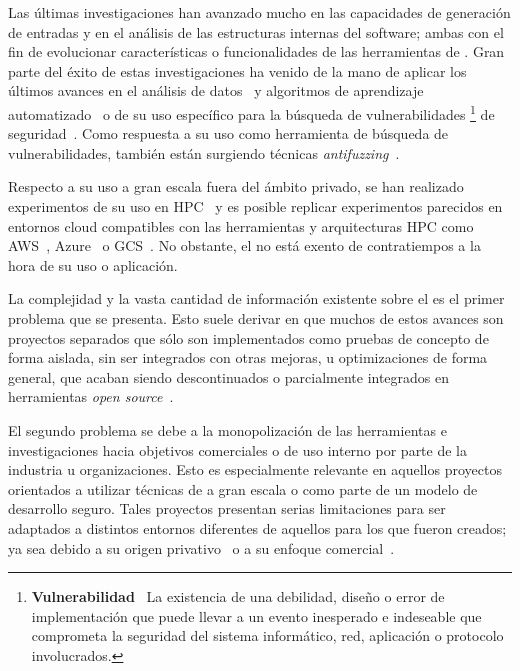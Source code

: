 \documentclass[10pt,conference,a4paper]{IEEEtran}
\begin{document}
Las últimas investigaciones han avanzado mucho en las capacidades de generación de entradas y en el análisis de las estructuras internas del software; ambas con el fin de evolucionar características o funcionalidades de las herramientas de {\fz}. Gran parte del éxito de estas investigaciones ha venido de la mano de aplicar los últimos avances en el análisis de datos~\cite{anal_datos} y algoritmos de aprendizaje automatizado~\cite{aprend_auto} o de su uso específico para la búsqueda de vulnerabilidades%
\footnote{\textbf{Vulnerabilidad}~\cite{ENISA_risk_security_ref}
La existencia de una debilidad, diseño o error de implementación que puede llevar a un evento inesperado e indeseable que comprometa la seguridad del sistema informático, red, aplicación o protocolo involucrados.
}
de seguridad~\cite{fuzzing_V-Fuzz}. Como respuesta a su uso como herramienta de búsqueda de vulnerabilidades, también están surgiendo técnicas \textit{antifuzzing}~\cite{fuzzing_antifuzz}.

Respecto a su uso a gran escala fuera del ámbito privado, se han realizado experimentos de su uso en HPC~\cite{HPC_fuzzing} y es posible replicar experimentos parecidos en entornos cloud compatibles con las herramientas y arquitecturas HPC como AWS~\cite{AWS_doc-slurm_plugin}, Azure~\cite{Azure_doc-CycleCloud_slurm} o GCS~\cite{slurm_doc-elastic_aws_gc}. No obstante, el {\fz} no está exento de contratiempos a la hora de su uso o aplicación.

La complejidad y la vasta cantidad de información existente sobre el {\fz} es el primer problema que se presenta. Esto suele derivar en que muchos de estos avances son proyectos separados que sólo son implementados como pruebas de concepto de forma aislada, sin ser integrados con otras mejoras, u optimizaciones de forma general, que acaban siendo descontinuados o parcialmente integrados en herramientas \textit{open source}~\cite{fuzz_tool_afl++_paper}.

El segundo problema se debe a la monopolización de las herramientas e investigaciones hacia objetivos comerciales o de uso interno por parte de la industria u organizaciones. Esto es especialmente relevante en aquellos proyectos orientados a utilizar técnicas de {\fz} a gran escala o como parte de un modelo de desarrollo seguro. Tales proyectos presentan serias limitaciones para ser adaptados a distintos entornos diferentes de aquellos para los que fueron creados; ya sea debido a su origen privativo~\cite{HPC_fuzzing_multinode,google_fuzz} o a su enfoque comercial~\cite{microsoft_fuzz,microsoft_tool_azure}.
\end{document}
